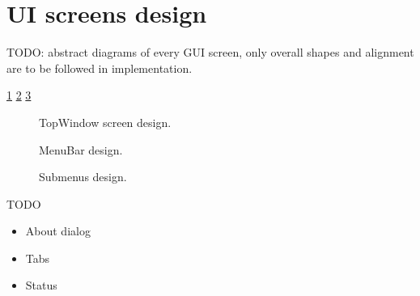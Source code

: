 \section{UI screens design}
TODO: abstract diagrams of every GUI screen, only overall shapes and alignment
are to be followed in implementation.

\cref{fig:topwindow_screen}
\cref{fig:menubar_design}
\cref{fig:submenus_design}

\begin{figure}
  
  \caption{\label{fig:topwindow_screen} TopWindow screen design.}
\end{figure}

\begin{figure}
  
  \caption{\label{fig:menubar_design} MenuBar design.}
\end{figure}

\begin{figure}

\caption{\label{fig:submenus_design} Submenus design.}
\end{figure}

TODO
\begin{itemize}
\item About dialog
\item Tabs
\item Status
\end{itemize}